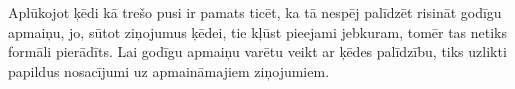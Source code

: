 Aplūkojot ķēdi kā trešo pusi ir pamats ticēt, ka tā nespēj palīdzēt risināt godīgu apmaiņu, jo, sūtot ziņojumus ķēdei, tie kļūst pieejami jebkuram, tomēr tas netiks formāli pierādīts. Lai godīgu apmaiņu varētu veikt ar ķēdes palīdzību, tiks uzlikti papildus nosacījumi uz apmaināmajiem ziņojumiem. 
